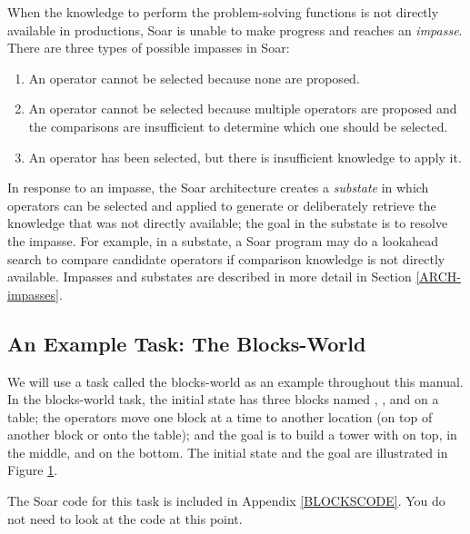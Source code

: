 When the knowledge to perform the problem-solving functions is not
directly available in productions, Soar is unable to make progress and
reaches an \textit{impasse}.  There are three types of possible impasses
in Soar:
\begin{enumerate}
\item An operator cannot be selected because none are proposed.\vspace{-4pt}
\item An operator cannot be selected because multiple operators are
        proposed and the comparisons are insufficient to determine which
        one should be selected.\vspace{-4pt}
\item An operator has been selected, but there is insufficient knowledge
        to apply it.\vspace{-4pt}
\end{enumerate}
In response to an impasse, the Soar architecture creates a
\textit{substate} in which operators can be selected and applied to
generate or deliberately retrieve the knowledge that was not directly
available; the goal in the substate is to resolve the impasse. For
example, in a substate, a Soar program may do a lookahead search to
compare candidate operators if comparison knowledge is not directly
available.  Impasses and substates are described in more detail in
Section \ref{ARCH-impasses}.


\subsection{An Example Task: The Blocks-World}

We will use a task called the blocks-world as an example throughout this
manual. In the blocks-world task, the initial state has three blocks named
, , and  on a table; the operators move one block at a
time to another location (on top of another block or onto the table); and the
goal is to build a tower with  on top,  in the middle, and
 on the bottom. The initial state and the goal are illustrated in
Figure \ref{fig:blocks}.

The Soar code for this task is included in Appendix \ref{BLOCKSCODE}. You do not
need to look at the code at this point.

\begin{figure}
\label{fig:blocks}
\end{figure}

